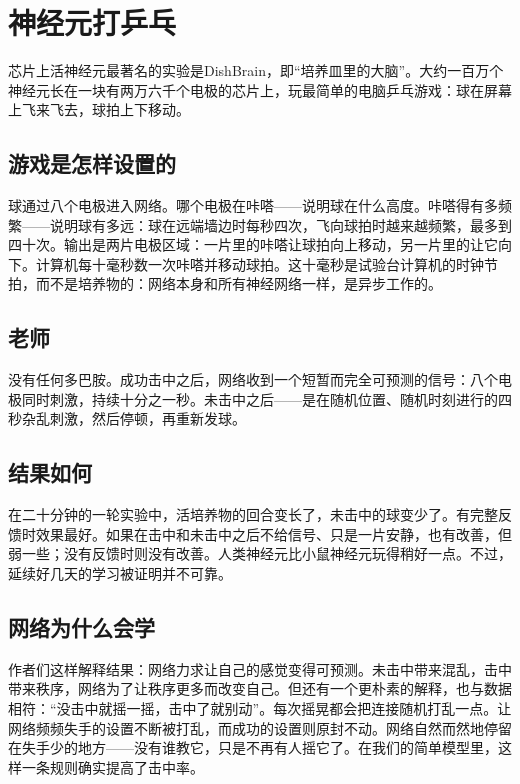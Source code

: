 \chapter{神经元打乒乓}

芯片上活神经元最著名的实验是DishBrain，即“培养皿里的大脑”。大约一百万个神经元长在一块有两万六千个电极的芯片上，玩最简单的电脑乒乓游戏：球在屏幕上飞来飞去，球拍上下移动。

\section*{游戏是怎样设置的}

球通过八个电极进入网络。哪个电极在咔嗒——说明球在什么高度。咔嗒得有多频繁——说明球有多远：球在远端墙边时每秒四次，飞向球拍时越来越频繁，最多到四十次。输出是两片电极区域：一片里的咔嗒让球拍向上移动，另一片里的让它向下。计算机每十毫秒数一次咔嗒并移动球拍。这十毫秒是试验台计算机的时钟节拍，而不是培养物的：网络本身和所有神经网络一样，是异步工作的。


\section*{老师}

没有任何多巴胺。成功击中之后，网络收到一个短暂而完全可预测的信号：八个电极同时刺激，持续十分之一秒。未击中之后——是在随机位置、随机时刻进行的四秒杂乱刺激，然后停顿，再重新发球。

\section*{结果如何}

在二十分钟的一轮实验中，活培养物的回合变长了，未击中的球变少了。有完整反馈时效果最好。如果在击中和未击中之后不给信号、只是一片安静，也有改善，但弱一些；没有反馈时则没有改善。人类神经元比小鼠神经元玩得稍好一点。不过，延续好几天的学习被证明并不可靠。

\section*{网络为什么会学}

作者们这样解释结果：网络力求让自己的感觉变得可预测。未击中带来混乱，击中带来秩序，网络为了让秩序更多而改变自己。但还有一个更朴素的解释，也与数据相符：“没击中就摇一摇，击中了就别动”。每次摇晃都会把连接随机打乱一点。让网络频频失手的设置不断被打乱，而成功的设置则原封不动。网络自然而然地停留在失手少的地方——没有谁教它，只是不再有人摇它了。在我们的简单模型里，这样一条规则确实提高了击中率。

